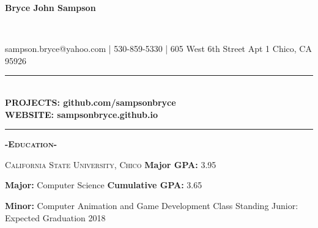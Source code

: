 \documentclass[12pt]{article}
\begin{document}
\center
\begin{Huge}\textbf{Bryce John Sampson}\end{Huge}\\
\medskip
\fontsize{12}{1.2}
\selectfont

\noindent
sampson.bryce@yahoo.com | 530-859-5330 | 605 West 6th Street Apt 1 Chico, CA 95926
\noindent\rule{17cm}{0.4pt}\\
\smallskip
\textbf{PROJECTS: \color{TealBlue}github.com/sampsonbryce}\\
\smallskip
\textbf{WEBSITE: \color{TealBlue}sampsonbryce.github.io}\\
\smallskip
\noindent\rule{17cm}{0.4pt}

\center
\textbf{\textsc{-Education-}}\\
\flushleft
\begin{footnotesize}
\textsc{California State University, Chico}
\hfill
\color{Cerulean}\textbf{Major GPA: }\color{black}3.95\\

\color{black}
\smallskip

\color{Cerulean}\textbf{Major: }\color{black}Computer Science
\hfill
\color{Cerulean}\textbf{Cumulative GPA: }\color{black}3.65\\
\smallskip

\color{Cerulean}\textbf{Minor: }\color{black}Computer Animation and Game Development
\hfill
\color{gray}Class Standing Junior: Expected Graduation 2018\\
\smallskip

\end{footnotesize}

\smallskip
\end{document}
